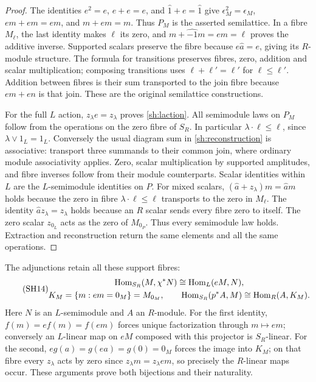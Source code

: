 \begin{proof}
The identities $e^2=e$, $e+e=e$, and $\widehat1+e=\widehat1$
give $\epsilon_M^2=\epsilon_M$,
$em+em=em$, and $m+em=m$. Thus $P_M$ is the asserted
semilattice. In a fibre $M_\ell$, the last identity makes $\ell$
its zero, and $m+\widehat{-1}m=em=\ell$ proves the additive
inverse. Supported scalars preserve the fibre because
$e\widehat a=e$, giving its $R$-module structure. The formula
for transitions preserves fibres, zero, addition and scalar
multiplication; composing transitions uses
$\ell+\ell'=\ell'$ for $\ell\le\ell'$. Addition between fibres
is their sum transported to the join fibre because $em+en$
is that join. These are the original semilattice constructions.

For the full $L$ action, $z_\lambda e=z_\lambda$ proves
\eqref{sh:laction}. All semimodule laws on $P_M$ follow from
the operations on the zero fibre of $S_R$. In particular
$\lambda\cdot\ell\le\ell$, since $\lambda\vee1_L=1_L$.
Conversely the usual diagram sum in \eqref{sh:reconstruction}
is associative: transport three summands to their common join,
where ordinary module associativity applies. Zero, scalar
multiplication by supported amplitudes, and fibre inverses follow
from their module counterparts. Scalar identities within $L$ are
the $L$-semimodule identities on $P$. For mixed scalars,
$(\widehat a+z_\lambda)m=\widehat a m$ holds because the zero
in fibre $\lambda\cdot\ell\le\ell$ transports to the zero in
$M_\ell$. The identity $\widehat a z_\lambda=z_\lambda$
holds because an $R$ scalar sends every fibre zero to itself.
The zero scalar $z_{0_L}$ acts as the zero of $M_{0_P}$.
Thus every semimodule law holds. Extraction and reconstruction
return the same elements and all the same operations.
\end{proof}

The adjunctions retain all these support fibres:
\begin{equation}\tag{SH14}\label{sh:adjunctions}
 \begin{gathered}
 \operatorname{Hom}_{S_R}(M,\chi^*N)\cong\operatorname{Hom}_L(eM,N),\\
 K_M=\{m:em=0_M\}=M_{0_M},\qquad
 \operatorname{Hom}_{S_R}(p^*A,M)\cong\operatorname{Hom}_R(A,K_M).
 \end{gathered}
\end{equation}
Here $N$ is an $L$-semimodule and $A$ an $R$-module.
For the first identity, $f(m)=ef(m)=f(em)$ forces unique
factorization through $m\mapsto em$; conversely an $L$-linear
map on $eM$ composed with this projector is $S_R$-linear.
For the second, $eg(a)=g(ea)=g(0)=0_M$ forces the image into
$K_M$; on that fibre every $z_\lambda$ acts by zero since
$z_\lambda m=z_\lambda em$, so precisely the $R$-linear
maps occur. These arguments prove both bijections and their
naturality.

